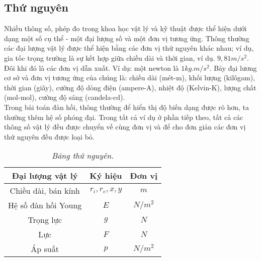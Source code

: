 \documentclass[
12pt, %
oneside, %
english, %
onehalfspacing, %
nolistspacing, %
headsepline, %
addchap,
]{MastersDoctoralThesis} %
\begin{document}
\subsection{Thứ nguyên}
Nhiều thông số, phép đo trong khoa học vật lý và kỹ thuật được thể hiện dưới dạng một số cụ thể - một đại lượng số và một đơn vị tương ứng. Thông thường các đại lượng vật lý được thể hiện bằng các đơn vị thứ nguyên khác nhau; ví dụ, gia tốc trọng trường là sự kết hợp giữa chiều dài và thời gian, ví dụ. $9,81m/s^2$. Đôi khi đó là các đơn vị dẫn xuất. Ví dụ: một newton là $1 kg.m/s^2$. Bảy đại lương cơ sở và đơn vị tương ứng của chúng là: chiều dài (mét-m), khối lượng (kilôgam), thời gian (giây), cường độ dòng điện (ampere-A), nhiệt độ (Kelvin-K), lượng chất (mol-mol), cường độ sáng (candela-cd).\\
Trong bài toán đàn hồi, thông thường để hiển thị độ biến dạng được rõ hơn, ta thường thêm hệ số phóng đại. Trong tất cả ví dụ ở phần tiếp theo, tất cả các thông số vật lý đều được chuyển về cùng đơn vị và để cho đơn giản các đơn vị thứ nguyên đều được loại bỏ.
\begin{table}[ht]
\centering
\begin{tabular}{ |c|c|c| } 
 \hline
 Đại lượng vật lý & Ký hiệu & Đơn vị \\ 
 \hline
 Chiều dài, bán kính & $r_i, r_e, x, y$ & $m$ \\ 
 Hệ số đàn hồi Young & $E$ & $N/m^2$ \\ 
 Trọng lực & $g$ & $N$ \\ 
 Lực & $F$ & $N$ \\ 
 Áp suất & $p$ & $N/m^2$ \\ 
 \hline
\end{tabular}
\caption{\em Bảng thứ nguyên.}\label{tab:thunghuyen}
\end{table}
\end{document}
